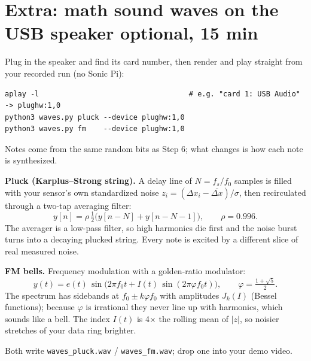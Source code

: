 \documentclass[11pt]{article}
\newcommand{\clock}[1]{\hfill\textcolor{black!55}{\small\textbf{#1}}}
\begin{document}
\section{Extra: math sound waves on the USB speaker \clock{optional, 15 min}}
Plug in the speaker and find its card number, then render and play straight from your recorded run
(no Sonic Pi):
\begin{lstlisting}
aplay -l                                   # e.g. "card 1: USB Audio" -> plughw:1,0
python3 waves.py pluck --device plughw:1,0
python3 waves.py fm    --device plughw:1,0
\end{lstlisting}
Notes come from the same random bits as Step 6; what changes is how each note is synthesized.

\textbf{Pluck (Karplus--Strong string).} A delay line of $N=f_s/f_0$ samples is filled with your
sensor's own standardized noise $z_i=(\Delta x_i-\overline{\Delta x})/\sigma$, then recirculated through
a two-tap averaging filter:
\[
y[n]=\rho\,\tfrac12\bigl(y[n-N]+y[n-N-1]\bigr),\qquad \rho=0.996 .
\]
The averager is a low-pass filter, so high harmonics die first and the noise burst turns into a
decaying plucked string. Every note is excited by a different slice of real measured noise.

\textbf{FM bells.} Frequency modulation with a golden-ratio modulator:
\[
y(t)=e(t)\,\sin\!\bigl(2\pi f_0 t + I(t)\,\sin(2\pi\varphi f_0 t)\bigr),\qquad \varphi=\tfrac{1+\sqrt5}{2}.
\]
The spectrum has sidebands at $f_0\pm k\varphi f_0$ with amplitudes $J_k(I)$ (Bessel functions);
because $\varphi$ is irrational they never line up with harmonics, which sounds like a bell. The
index $I(t)$ is 4$\times$ the rolling mean of $|z|$, so noisier stretches of your data ring brighter.

Both write \texttt{waves\_pluck.wav} / \texttt{waves\_fm.wav}; drop one into your demo video.

\end{document}
